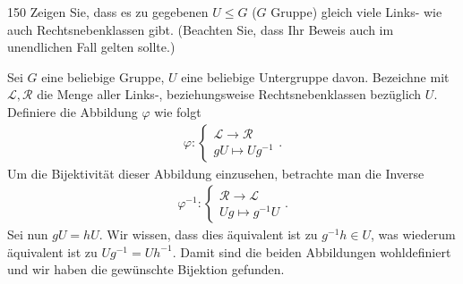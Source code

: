 \begin{algebraUE}{150}
Zeigen Sie, dass es zu gegebenen $U \leq G$ ($G$ Gruppe) gleich viele Links-
wie auch Rechtsnebenklassen gibt. (Beachten Sie, dass Ihr Beweis auch im unendlichen
Fall gelten sollte.)
\end{algebraUE}
\begin{solution}
Sei $G$ eine beliebige Gruppe, $U$ eine beliebige Untergruppe davon.
Bezeichne mit $\mathcal{L},\mathcal{R}$ die Menge
aller Links-, beziehungsweise Rechtsnebenklassen bezüglich $U$.
Definiere die Abbildung $\varphi$ wie folgt
\begin{align*}
  \varphi: \begin{cases}
    \mathcal{L} \rightarrow \mathcal{R} \\
    gU \mapsto Ug^{-1}
  \end{cases}.
\end{align*}
Um die Bijektivität dieser Abbildung einzusehen, betrachte man die Inverse
\begin{align*}
  \varphi^{-1}: \begin{cases}
    \mathcal{R} \rightarrow \mathcal{L} \\
    Ug \mapsto g^{-1}U
  \end{cases}.
\end{align*}
Sei nun $gU = hU$. Wir wissen, dass dies äquivalent ist zu $g^{-1}h \in U$,
was wiederum äquivalent ist zu $Ug^{-1} = Uh^{-1}$.
Damit sind die beiden Abbildungen wohldefiniert und wir haben die gewünschte
Bijektion gefunden.
\end{solution}
